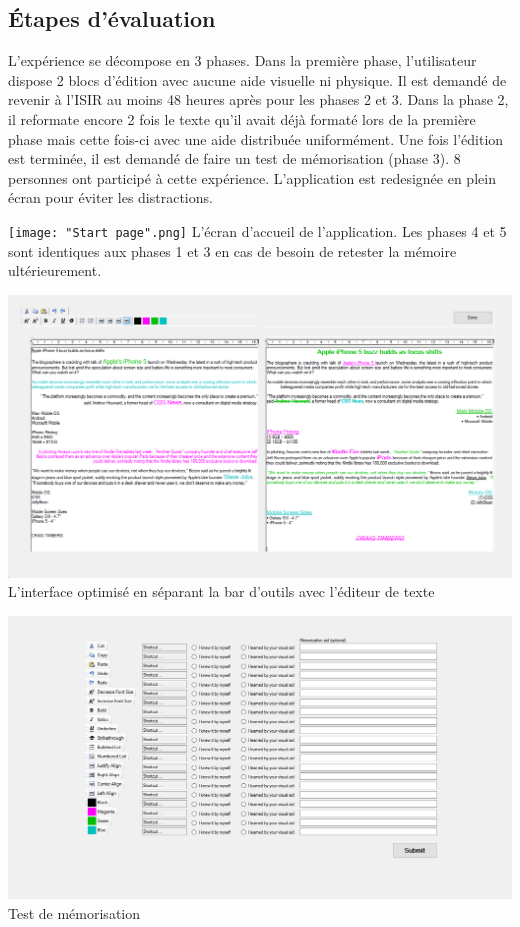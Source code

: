 \documentclass[12pt,a4paper]{article}
\begin{document}
\subsection{Étapes d'évaluation}
L'expérience se décompose en 3 phases. Dans la première phase, l'utilisateur dispose 2 blocs d'édition avec aucune aide visuelle ni physique. Il est demandé de revenir à l'ISIR au moins 48 heures après pour les phases 2 et 3. Dans la phase 2, il reformate encore 2 fois le texte qu'il avait déjà formaté lors de la première phase mais cette fois-ci avec une aide distribuée uniformément. Une fois l'édition est terminée, il est demandé de faire un test de mémorisation (phase 3). 8 personnes ont participé à cette expérience. L'application est redesignée en plein écran pour éviter les distractions.
\begin{center}
	\texttt{[image: "Start page".png]}
	L'écran d'accueil de l'application. Les phases 4 et 5 sont identiques aux phases 1 et 3 en cas de besoin de retester la mémoire ultérieurement.
\end{center}
\begin{center}
	\includegraphics[width=1\linewidth]{Editor2.png}
	L'interface optimisé en séparant la bar d'outils avec l'éditeur de texte
\end{center}
\begin{center}
	\includegraphics[width=1\linewidth]{Memo.png}
	Test de mémorisation
\end{center}
\end{document}

